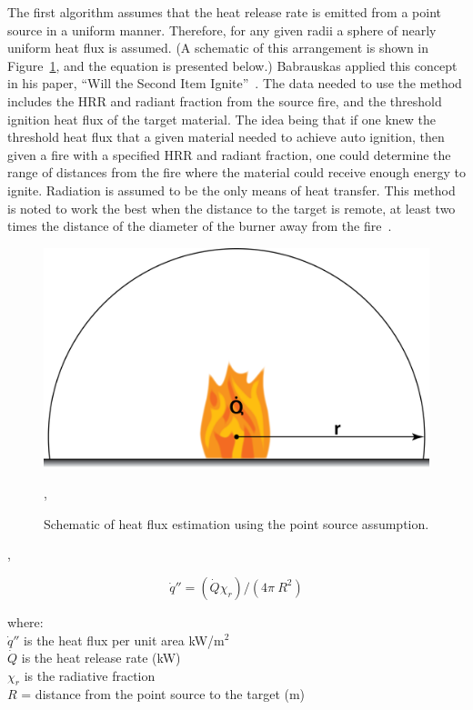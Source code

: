 \documentclass[twoside]{uocthesis}
\begin{document}
{The first algorithm assumes that the heat release rate is emitted from a point source in a uniform manner.  Therefore, for any given radii a sphere of nearly uniform heat flux is assumed. (A schematic of this arrangement is shown in Figure~\ref{PointSourceHF}, and the equation is presented below.) Babrauskas applied this concept in his paper, ``Will the Second Item Ignite''~\cite{Babrauskas:1981}.  The data needed to use the method includes the HRR and radiant fraction from the source fire, and the threshold ignition heat flux of the target material.  The idea being that if one knew the threshold heat flux that a given material needed to achieve auto ignition, then given a fire with a specified HRR and radiant fraction, one could determine the range of distances from the fire where the material could receive enough energy to ignite.  Radiation is assumed to be the only means of heat transfer.  This method is noted to work the best when the distance to the target is remote, at least two times the distance of the diameter of the burner away from the fire~\cite{Hamins:1991,Modak:1977}. 

\begin{figure}
	\centering
	\includegraphics[width=4.5in]{../Figures/PointSourceHF}
	\caption{Schematic of heat flux estimation using the point source assumption.}
	\label{PointSourceHF},
\end{figure},

\begin{equation} \label{eq:second_item}
\dot{q}'' = (\dot{Q} \chi_r)/(4 \pi\ R^2)
\end{equation}

\begin{tabbing}
where: \=  \\
{}
\> $\dot{q}''$ is the heat flux per unit area kW/m$^2$\\
\> $\dot{Q}$ is the heat release rate (kW) \\ 
\> $\chi_r$ is the radiative fraction \\
\> $R$ = distance from the point source to the target (m) \\
\end{tabbing}

}
\end{document}
